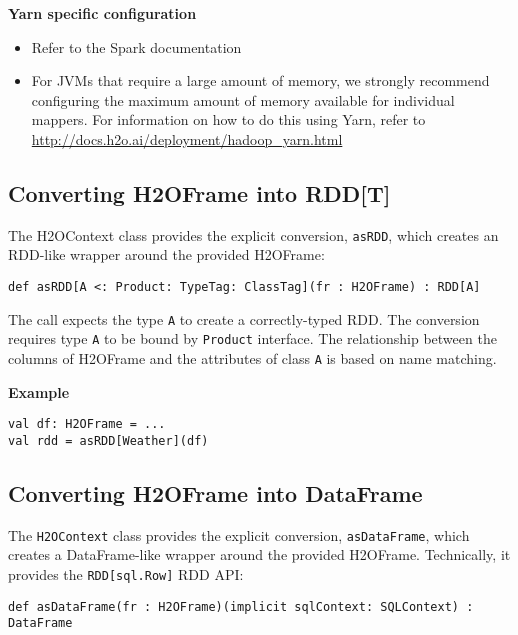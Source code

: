 \textbf{Yarn specific configuration}

\begin{itemize}
\item Refer to the Spark documentation
\item For JVMs that require a large amount of memory, we strongly recommend configuring the maximum amount of memory available for individual mappers. For information on how to do this using Yarn, refer to {\url{http://docs.h2o.ai/deployment/hadoop_yarn.html}}
 \end{itemize} 
 
 \subsection{Converting H2OFrame into RDD[T]}
 
 The H2OContext class provides the explicit conversion, \texttt{asRDD}, which creates an RDD-like wrapper around the provided H2OFrame:

\begin{lstlisting}[style=Scala]
def asRDD[A <: Product: TypeTag: ClassTag](fr : H2OFrame) : RDD[A]
\end{lstlisting}

The call expects the type \texttt{A} to create a correctly-typed RDD. The conversion requires type \texttt{A} to be bound by \texttt{Product} interface. The relationship between the columns of H2OFrame and the attributes of class \texttt{A} is based on name matching.

\textbf{Example}

\begin{lstlisting}[style=Scala]
val df: H2OFrame = ...
val rdd = asRDD[Weather](df)
\end{lstlisting}

\subsection{Converting H2OFrame into DataFrame}

The \texttt{H2OContext} class provides the explicit conversion, \texttt{asDataFrame}, which creates a DataFrame-like wrapper around the provided H2OFrame. Technically, it provides the \texttt{RDD[sql.Row]} RDD API:

\begin{lstlisting}[style=Scala]
def asDataFrame(fr : H2OFrame)(implicit sqlContext: SQLContext) : DataFrame
\end{lstlisting}

